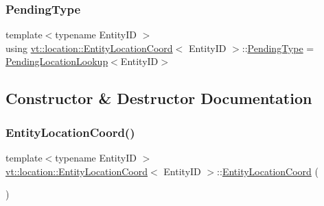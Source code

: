 \subsubsection{\texorpdfstring{Pending\+Type}{PendingType}}
{\footnotesize\ttfamily template$<$typename Entity\+ID $>$ \\
using \hyperlink{structvt_1_1location_1_1_entity_location_coord}{vt\+::location\+::\+Entity\+Location\+Coord}$<$ Entity\+ID $>$\+::\hyperlink{structvt_1_1location_1_1_entity_location_coord_a41b5c3792967e089c7e592b705c266c3}{Pending\+Type} =  \hyperlink{structvt_1_1location_1_1_pending_location_lookup}{Pending\+Location\+Lookup}$<$Entity\+ID$>$}



\subsection{Constructor \& Destructor Documentation}
\mbox{\label{structvt_1_1location_1_1_entity_location_coord_a84d2166e5a2c192b081c222e15e93882}} 
\subsubsection{\texorpdfstring{Entity\+Location\+Coord()}{EntityLocationCoord()}\hspace{0.1cm}{\footnotesize\ttfamily [1/3]}}
{\footnotesize\ttfamily template$<$typename Entity\+ID $>$ \\
\hyperlink{structvt_1_1location_1_1_entity_location_coord}{vt\+::location\+::\+Entity\+Location\+Coord}$<$ Entity\+ID $>$\+::\hyperlink{structvt_1_1location_1_1_entity_location_coord}{Entity\+Location\+Coord} (\begin{DoxyParamCaption}{ }\end{DoxyParamCaption})}

\mbox{\label{structvt_1_1location_1_1_entity_location_coord_a0a25560f861221daafca33ce2657f04b}} 
